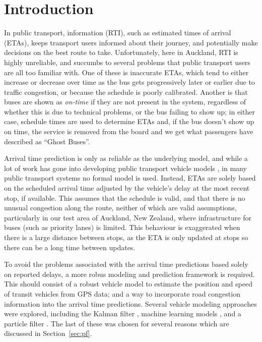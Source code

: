 \section{Introduction}
\label{sec:intro}



In public transport, \rt information (RTI), such as estimated times of arrival (ETAs),
keeps transport users informed about their journey,
and potentially make decisions on the best route to take.
Unfortunately, here in Auckland, RTI is highly unreliable,
and succumbs to several problems that public transport users
are all too familiar with.
One of these is inaccurate ETAs,
which tend to either increase or decrease over time as the bus gets progressively later or earlier
due to traffic congestion, or  because the schedule is poorly calibrated.
Another is that buses are shown as \emph{on-time} if they are not present
in the \rt system,
regardless of whether this is due to technical problems,
or the bus failing to show up;
in either case, schedule times are used to determine ETAs and, 
if the bus doesn't show up on time,
the service is removed from the \rt board 
and we get what passengers have described as ``Ghost Buses''.

Arrival time prediction is only as reliable as the underlying model,
and while a lot of work has gone into developing public transport vehicle models
\citep{Cathey_2003,Jeong_2005,Yu_2011,Hans_2015},
in many public transport systems no formal model is used.
Instead, ETAs are solely based on the scheduled arrival time
adjusted by the vehicle's delay at the most recent stop, if available.
This assumes that the schedule is valid,
and that there is no unusual congestion along the route,
neither of which are valid assumptions,
particularly in our test area of Auckland, New Zealand,
where infrastructure for buses (such as priority lanes) is limited.
This behaviour is exaggerated when there is a large distance between stops,
as the ETA is only updated at stops so there can be a long time between updates.


To avoid the problems associated with the arrival time predictions
based solely on reported delays,
a more robus modeling and prediction framework is required.
This should consist of a robust vehicle model to estimate the position and speed
of transit vehicles from \rt GPS data;
and a way to incorporate road congestion information 
into the arrival time predictions.
Several vehicle modeling approaches were explored, 
including the Kalman filter \citep{Dailey_2001,Cathey_2003},
machine learning models \citep{Yu_2006,Chang_2010},
and a particle filter \citep{Hans_2015}.
The last of these was chosen for several reasons
which are discussed in Section~\ref{sec:pf}.


